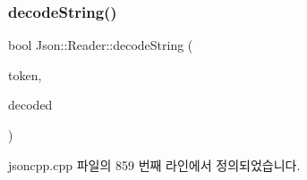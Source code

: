 \subsubsection{\texorpdfstring{decode\+String()}{decodeString()}\hspace{0.1cm}{\footnotesize\ttfamily [2/2]}}
{\footnotesize\ttfamily bool Json\+::\+Reader\+::decode\+String (\begin{DoxyParamCaption}\item[{\hyperlink{class_json_1_1_reader_1_1_token}{Token} \&}]{token,  }\item[{\hyperlink{json_8h_a1e723f95759de062585bc4a8fd3fa4be}{J\+S\+O\+N\+C\+P\+P\+\_\+\+S\+T\+R\+I\+NG} \&}]{decoded }\end{DoxyParamCaption})\hspace{0.3cm}{\ttfamily [private]}}



jsoncpp.\+cpp 파일의 859 번째 라인에서 정의되었습니다.



